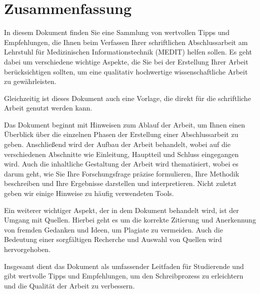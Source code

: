 \chapter{Zusammenfassung}

In diesem Dokument finden Sie eine Sammlung von wertvollen Tipps und Empfehlungen, die Ihnen beim Verfassen Ihrer schriftlichen Abschlussarbeit am Lehrstuhl für Medizinischen Informationstechnik (MEDIT) helfen sollen. Es geht dabei um verschiedene wichtige Aspekte, die Sie bei der Erstellung Ihrer Arbeit berücksichtigen sollten, um eine qualitativ hochwertige wissenschaftliche Arbeit zu gewährleisten.

Gleichzeitig ist dieses Dokument auch eine Vorlage, die direkt für die schriftliche Arbeit genutzt werden kann.

Das Dokument beginnt mit Hinweisen zum Ablauf der Arbeit, um Ihnen einen Überblick über die einzelnen Phasen der Erstellung einer Abschlussarbeit zu geben. Anschließend wird der Aufbau der Arbeit behandelt, wobei auf die verschiedenen Abschnitte wie Einleitung, Hauptteil und Schluss eingegangen wird. Auch die inhaltliche Gestaltung der Arbeit wird thematisiert, wobei es darum geht, wie Sie Ihre Forschungsfrage präzise formulieren, Ihre Methodik beschreiben und Ihre Ergebnisse darstellen und interpretieren. Nicht zuletzt geben wir einige Hinweise zu häufig verwendeten Tools.

Ein weiterer wichtiger Aspekt, der in dem Dokument behandelt wird, ist der Umgang mit Quellen. Hierbei geht es um die korrekte Zitierung und Anerkennung von fremden Gedanken und Ideen, um Plagiate zu vermeiden. Auch die Bedeutung einer sorgfältigen Recherche und Auswahl von Quellen wird hervorgehoben.

Insgesamt dient das Dokument als umfassender Leitfaden für Studierende und gibt wertvolle Tipps und Empfehlungen, um den Schreibprozess zu erleichtern und die Qualität der Arbeit zu verbessern.



\cleardoubleemptypage
\thispagestyle{empty}
